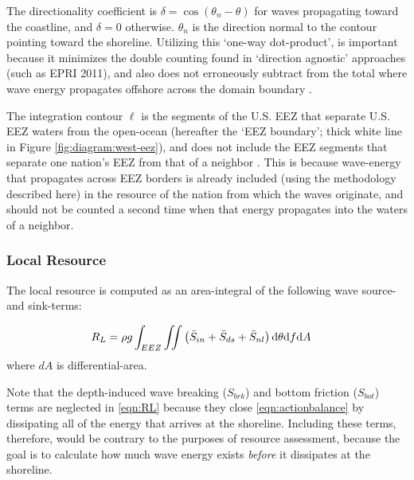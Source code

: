 The directionality coefficient is $\delta = \cos(\theta_n - \theta)$ for waves propagating toward the coastline, and $\delta = 0$ otherwise.  $\theta_n$ is the direction normal to the contour pointing toward the shoreline. Utilizing this `one-way dot-product', is important because it minimizes the double counting found in `direction agnostic' approaches (such as EPRI 2011), and also does not erroneously subtract from the total where wave energy propagates offshore across the domain boundary \citep{nationalresearchcouncilEvaluationDepartmentEnergy2013, gunnQuantifyingGlobalWave2012}.

The integration contour $\ell$ is the segments of the U.S. EEZ that separate U.S. EEZ waters from the open-ocean (hereafter the `EEZ boundary'; thick white line in Figure \ref{fig:diagram:west-eez}), and does not include the EEZ segments that separate one nation's EEZ from that of a neighbor \citep[]{flandersmarineinstituteMaritimeBoundariesGeodatabase2018}. This is because wave-energy that propagates across EEZ borders is already included (using the methodology described here) in the resource of the nation from which the waves originate, and should not be counted a second time when that energy propagates into the waters of a neighbor.

\subsubsection{Local Resource} \label{sec:method:calc:local}

The local resource is computed as an area-integral of the following wave source- and sink-terms:

\begin{align}
  R_L &= \rho g \int_{EEZ}\iint \left ( \bar{S}_{in} + \bar{S}_{ds} + \bar{S}_{nl} \right ) \mathrm{d} \theta \mathrm{d} f \mathrm{d} A
\label{eqn:RL}
\end{align}
where $dA$ is differential-area.

Note that the depth-induced wave breaking ($S_{brk}$) and bottom friction ($S_{bot}$) terms are neglected in \eqref{eqn:RL} because they close \eqref{eqn:actionbalance} by dissipating all of the energy that arrives at the shoreline. Including these terms, therefore, would be contrary to the purposes of resource assessment, because the goal is to calculate how much wave energy exists \textit{before} it dissipates at the shoreline.


